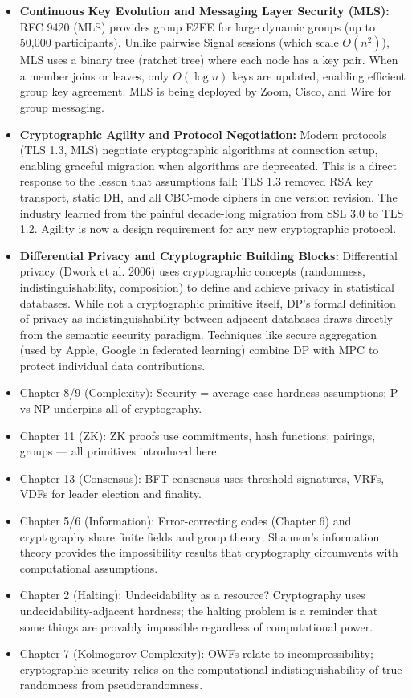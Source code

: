 \begin{itemize}
\item \textbf{Continuous Key Evolution and Messaging Layer Security (MLS):} RFC 9420 (MLS) provides group E2EE for large dynamic groups (up to 50,000 participants). Unlike pairwise Signal sessions (which scale $O(n^2)$), MLS uses a binary tree (ratchet tree) where each node has a key pair. When a member joins or leaves, only $O(\log n)$ keys are updated, enabling efficient group key agreement. MLS is being deployed by Zoom, Cisco, and Wire for group messaging.

\item \textbf{Cryptographic Agility and Protocol Negotiation:} Modern protocols (TLS 1.3, MLS) negotiate cryptographic algorithms at connection setup, enabling graceful migration when algorithms are deprecated. This is a direct response to the lesson that assumptions fall: TLS 1.3 removed RSA key transport, static DH, and all CBC-mode ciphers in one version revision. The industry learned from the painful decade-long migration from SSL 3.0 to TLS 1.2. Agility is now a design requirement for any new cryptographic protocol.

\item \textbf{Differential Privacy and Cryptographic Building Blocks:} Differential privacy (Dwork et al. 2006) uses cryptographic concepts (randomness, indistinguishability, composition) to define and achieve privacy in statistical databases. While not a cryptographic primitive itself, DP's formal definition of privacy as indistinguishability between adjacent databases draws directly from the semantic security paradigm. Techniques like secure aggregation (used by Apple, Google in federated learning) combine DP with MPC to protect individual data contributions.
\end{itemize}

\begin{itemize}
\item Chapter 8/9 (Complexity): Security = average-case hardness assumptions; P vs NP underpins all of cryptography.
\item Chapter 11 (ZK): ZK proofs use commitments, hash functions, pairings, groups — all primitives introduced here.
\item Chapter 13 (Consensus): BFT consensus uses threshold signatures, VRFs, VDFs for leader election and finality.
\item Chapter 5/6 (Information): Error-correcting codes (Chapter 6) and cryptography share finite fields and group theory; Shannon's information theory provides the impossibility results that cryptography circumvents with computational assumptions.
\item Chapter 2 (Halting): Undecidability as a resource? Cryptography uses undecidability-adjacent hardness; the halting problem is a reminder that some things are provably impossible regardless of computational power.
\item Chapter 7 (Kolmogorov Complexity): OWFs relate to incompressibility; cryptographic security relies on the computational indistinguishability of true randomness from pseudorandomness.
\end{itemize}

